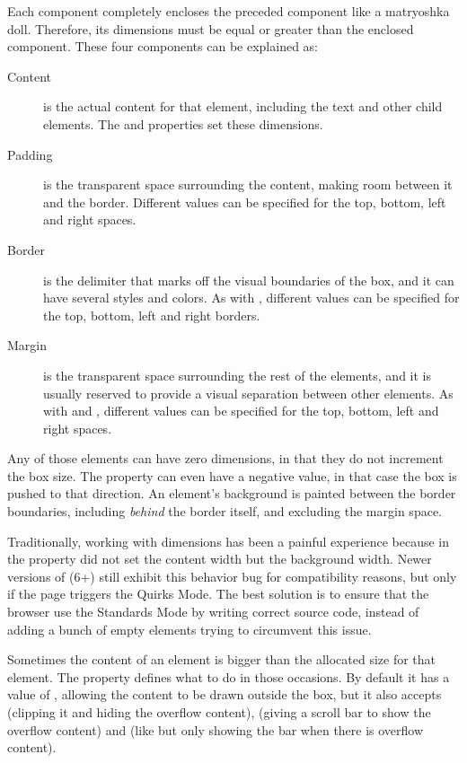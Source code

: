 Each component completely encloses the preceded component like a matryoshka doll.
Therefore, its dimensions must be equal or greater than the enclosed component.
These four components can be explained as:

\begin{description}
  \item[Content] is the actual content for that element, including the text and other child elements.
  The  and   properties set these dimensions.
  \item[Padding] is the transparent space surrounding the content, making room between it and the border.
  Different values can be specified for the top, bottom, left and right spaces.
  \item[Border] is the delimiter that marks off the visual boundaries of the box, and it can have several styles and colors.
  As with , different values can be specified for the top, bottom, left and right borders.
  \item[Margin] is the transparent space surrounding the rest of the elements, and it is usually reserved to provide a visual separation between other elements.
  As with  and , different values can be specified for the top, bottom, left and right spaces.
\end{description}

Any of those elements can have zero dimensions, in that they do not increment the box size.
The  property can even have a negative value, in that case the box is pushed to that direction.
An element's background is painted between the border boundaries, including \emph{behind} the border itself, and excluding the margin space.

Traditionally, working with  dimensions has been a painful experience because in  the  property did not set the content width but the background width.
Newer versions of  (6+) still exhibit this behavior bug for compatibility reasons, but only if the page triggers the Quirks Mode.
The best solution is to ensure that the browser use the Standards Mode by writing correct  source code, instead of adding a bunch of empty elements trying to circumvent this issue.

Sometimes the content of an element is bigger than the allocated size for that element.
The  property defines what to do in those occasions.
By default it has a value of , allowing the content to be drawn outside the box, but it also accepts  (clipping it and hiding the overflow content),  (giving a scroll bar to show the overflow content) and  (like  but only showing the bar when there is overflow content).

